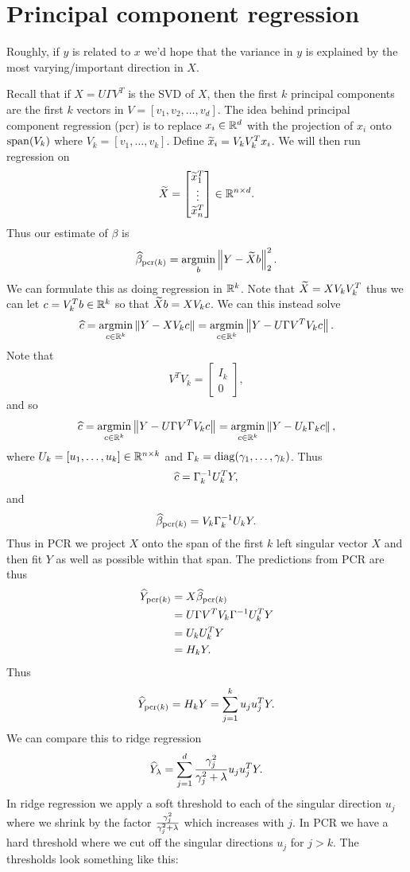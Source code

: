 \section{Principal component regression}
Roughly, if $y$ is related to $x$ we'd hope that the variance in $y$ is explained by the most varying/important direction in $X$. 

Recall that if $X = U\Gamma V^T$ is the SVD of $X$, then the first $k$ principal components are the first $k$ vectors in $V = [v_1,v_2,\ldots, v_d]$. The idea behind principal component regression (pcr) is to replace $x_i \in {\mathbb R}^d$ with the projection of $x_i$ onto $\operatorname{span}(V_k)$ where $V_k = [v_1,\ldots, v_k]$. Define $\widetilde{x}_i = V_kV_k^T x_i$. We will then run regression on 
\[\widetilde{X} = \begin{bmatrix}
    \widetilde{x}_1^T\\ \vdots \\ \widetilde{x}_n^T
\end{bmatrix} \in {\mathbb R}^{n \times d}. \]
Thus our estimate of $\beta$ is
\[\widehat{\beta}_{{\text{pcr}(k)}} = \operatorname*{argmin}_b \left\|Y-\widetilde{X}b\right\|_2^2. \]
We can formulate this as doing regression in ${\mathbb R}^k$. Note that $\widetilde{X}=XV_kV_k^T$ thus we can let $c = V_k^Tb \in {\mathbb R}^k$ so that $\widetilde{X}b = XV_k c$. We can this instead solve
\[\widehat{c} = \operatorname*{argmin}_{c \in {\mathbb R}^k} \left\|Y-XV_k c\right\| = \operatorname*{argmin}_{c \in {\mathbb R}^k}\left\|Y-U\Gamma V^TV_k c\right\|. \]
Note that 
\[V^TV_k = \begin{bmatrix}
    I_k \\ 0
\end{bmatrix}, \]
and so
\[\widehat{c} = \operatorname*{argmin}_{c \in {\mathbb R}^k}\left\|Y-U\Gamma V^TV_k c\right\| = \operatorname*{argmin}_{c\in {\mathbb R}^k} \left\|Y-U_k \Gamma_k c\right\|,\]
where $U_k = [u_1,\ldots, u_k] \in {\mathbb R}^{n \times k}$ and $\Gamma_k = \operatorname*{diag}(\gamma_1,\ldots, \gamma_k)$. Thus 
\[\widehat{c} = \Gamma_k^{-1}U_k^T Y, \]
and 
\[\widehat{\beta}_{\text{pcr}(k)} =  V_k \Gamma_k^{-1} U_k Y.\]
Thus in PCR we project $X$ onto the span of the first $k$ left singular vector $X$ and then fit $Y$ as well as possible within that span. The predictions from PCR are thus 
\begin{align*}
    \widehat{Y}_{\text{pcr}(k)} &= X\widehat{\beta}_{\text{pcr}(k)} \\
    &=U\Gamma V^T V_k \Gamma^{-1} U_k^T Y\\
    &= U_k U_k^T Y\\
    &= H_k Y.
\end{align*}
Thus 
\[\widehat{Y}_{\text{pcr}(k)} = H_k Y = \sum_{j=1}^k u_ju_j^TY.\] 
We can compare this to ridge regression 
\[\widehat{Y}_\lambda = \sum_{j=1}^d \frac{\gamma_j^2}{\gamma_j^2+\lambda} u_ju_j^T Y. \]
In ridge regression we apply a soft threshold to each of the singular direction $u_j$ where we shrink by the factor $\frac{\gamma_j^2}{\gamma_j^2+\lambda}$ which increases with $j$. In PCR we have a hard threshold where we cut off the singular directions $u_j$ for $j > k$. The thresholds look something like this:


